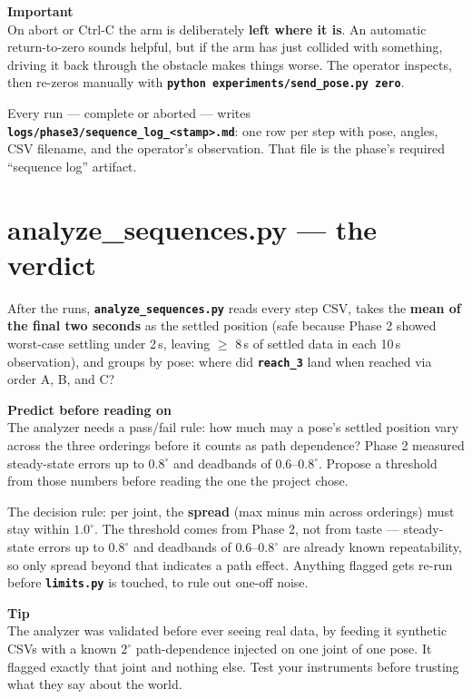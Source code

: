 \documentclass[11pt,twoside,openright]{book}
\newcommand{\code}[1]{\texttt{\bfseries #1}}
\newenvironment{pkttip}{\begin{pktbox}\textbf{Tip}\\[4pt]}{\end{pktbox}}
\newenvironment{pktimportant}{\begin{pktbox}\textbf{Important}\\[4pt]}{\end{pktbox}}
\newenvironment{pktpredict}{\begin{pktpredictbox}\textbf{\color{accentorange}Predict before reading on}\\[4pt]}{\end{pktpredictbox}}
\begin{document}
\begin{pktimportant}
On abort or Ctrl-C the arm is deliberately \textbf{left where it is}. An
automatic return-to-zero sounds helpful, but if the arm has just collided
with something, driving it back through the obstacle makes things worse.
The operator inspects, then re-zeros manually with
\code{python experiments/send\_pose.py zero}.
\end{pktimportant}

Every run --- complete or aborted --- writes
\code{logs/phase3/sequence\_log\_<stamp>.md}: one row per step with pose,
angles, CSV filename, and the operator's observation. That file is the
phase's required ``sequence log'' artifact.

\section{analyze\_sequences.py --- the verdict}

After the runs, \code{analyze\_sequences.py} reads every step CSV, takes
the \textbf{mean of the final two seconds} as the settled position (safe
because Phase 2 showed worst-case settling under 2\,s, leaving $\ge$ 8\,s
of settled data in each 10\,s observation), and groups by pose: where did
\code{reach\_3} land when reached via order A, B, and C?

\begin{pktpredict}
The analyzer needs a pass/fail rule: how much may a pose's settled
position vary across the three orderings before it counts as path
dependence? Phase 2 measured steady-state errors up to $0.8^\circ$ and
deadbands of $0.6$--$0.8^\circ$. Propose a threshold from those numbers
before reading the one the project chose.
\end{pktpredict}

The decision rule: per joint, the \textbf{spread} (max minus min across
orderings) must stay within $1.0^\circ$. The threshold comes from Phase 2,
not from taste --- steady-state errors up to $0.8^\circ$ and deadbands of
$0.6$--$0.8^\circ$ are already known repeatability, so only spread beyond
that indicates a path effect. Anything flagged gets re-run before
\code{limits.py} is touched, to rule out one-off noise.

\begin{pkttip}
The analyzer was validated before ever seeing real data, by feeding it
synthetic CSVs with a known $2^\circ$ path-dependence injected on one
joint of one pose. It flagged exactly that joint and nothing else. Test
your instruments before trusting what they say about the world.
\end{pkttip}
\end{document}
